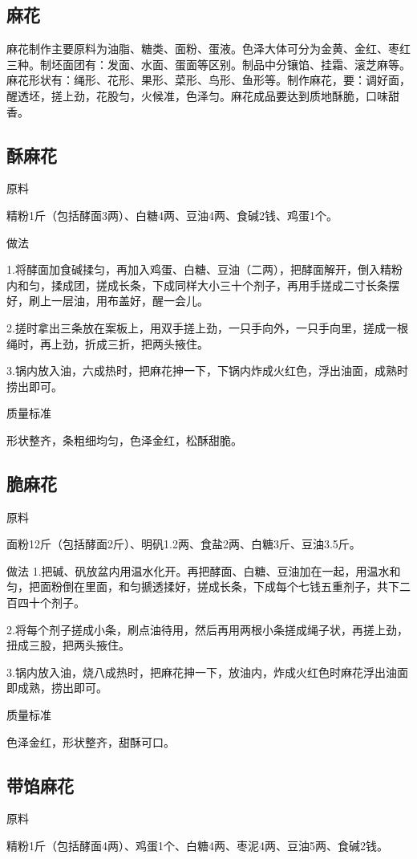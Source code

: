 \documentclass{ctexbook}
\begin{document}
\subsection{麻花}
麻花制作主要原料为油脂、糖类、面粉、蛋液。色泽大体可分为金黄、金红、枣红三种。制坯面团有：发面、水面、蛋面等区别。制品中分镶馅、挂霜、滚芝麻等。麻花形状有：绳形、花形、果形、菜形、鸟形、鱼形等。制作麻花，要：调好面，醒透坯，搓上劲，花股匀，火候准，色泽匀。麻花成品要达到质地酥脆，口味甜香。
\subsection{酥麻花}
原料

精粉1斤（包括酵面3两）、白糖4两、豆油4两、食碱2钱、鸡蛋1个。

做法

1.将酵面加食碱揉匀，再加入鸡蛋、白糖、豆油（二两），把酵面解开，倒入精粉内和匀，揉成团，搓成长条，下成同样大小三十个剂子，再用手搓成二寸长条摆好，刷上一层油，用布盖好，醒一会儿。

2.搓时拿出三条放在案板上，用双手搓上劲，一只手向外，一只手向里，搓成一根绳时，再上劲，折成三折，把两头掖住。

3.锅内放入油，六成热时，把麻花抻一下，下锅内炸成火红色，浮出油面，成熟时捞出即可。

质量标准

形状整齐，条粗细均匀，色泽金红，松酥甜脆。
\subsection{脆麻花}
原料

面粉12斤（包括酵面2斤）、明矾1.2两、食盐2两、白糖3斤、豆油3.5斤。

做法
1.把碱、矾放盆内用温水化开。再把酵面、白糖、豆油加在一起，用温水和匀，把面粉倒在里面，和匀搋透揉好，搓成长条，下成每个七钱五重剂子，共下二百四十个剂子。

2.将每个剂子搓成小条，刷点油待用，然后再用两根小条搓成绳子状，再搓上劲，扭成三股，把两头掖住。

3.锅内放入油，烧八成热时，把麻花抻一下，放油内，炸成火红色时麻花浮出油面即成熟，捞出即可。

质量标准

色泽金红，形状整齐，甜酥可口。
\subsection{带馅麻花}
原料

精粉1斤（包括酵面4两）、鸡蛋1个、白糖4两、枣泥4两、豆油5两、食碱2钱。
\end{document}
